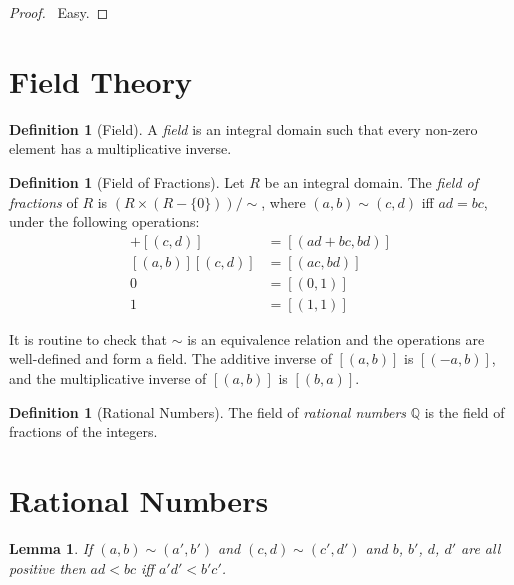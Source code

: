 \documentclass{article}
\let\qed\relax
\newtheorem{lemma}[axiom]{Lemma}
\theoremstyle{definition}
\newtheorem{definition}[axiom]{Definition}
\begin{document}
    \begin{proof}
        \pf\ Easy. \qed
    \end{proof}

    \section{Field Theory}

    \begin{definition}[Field]
        A \emph{field} is an integral domain such that every non-zero element has a multiplicative inverse.
    \end{definition}

    \begin{definition}[Field of Fractions]
        Let $R$ be an integral domain. The \emph{field of fractions} of $R$ is $(R \times (R - \{ 0 \})) / \sim$,
        where $(a,b) \sim (c,d)$ iff $ad = bc$, under the following operations:
        \begin{align*}
            [(a,b)] + [(c,d)] & = [(ad+bc,bd)] \\
            [(a,b)][(c,d)] & = [(ac,bd)] \\
            0 & = [(0,1)] \\
            1 & = [(1,1)]
        \end{align*}

        It is routine to check that $\sim$ is an equivalence relation and the operations are well-defined
        and form a field. The additive inverse of $[(a,b)]$ is $[(-a,b)]$, and the multiplicative inverse
        of $[(a,b)]$ is $[(b,a)]$.
    \end{definition}

    \begin{definition}[Rational Numbers]
        The field of \emph{rational numbers} $\mathbb{Q}$ is the field of fractions of the integers.
    \end{definition}



    \section{Rational Numbers}

    \begin{lemma}
        If $(a,b) \sim (a',b')$ and $(c,d) \sim (c',d')$ and $b$, $b'$, $d$, $d'$
        are all positive then $ad<bc$ iff $a'd'<b'c'$.
    \end{lemma}
\end{document}
